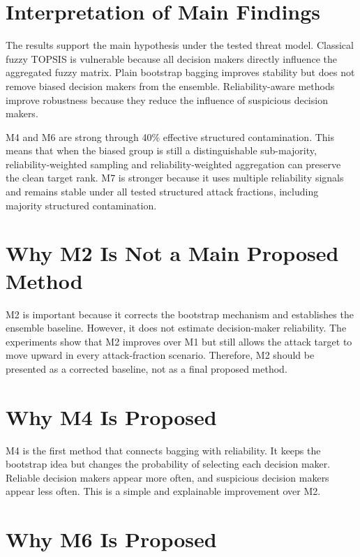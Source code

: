 \section{Interpretation of Main Findings}

The results support the main hypothesis under the tested threat model. Classical fuzzy TOPSIS is vulnerable because all decision makers directly influence the aggregated fuzzy matrix. Plain bootstrap bagging improves stability but does not remove biased decision makers from the ensemble. Reliability-aware methods improve robustness because they reduce the influence of suspicious decision makers.

M4 and M6 are strong through 40\% effective structured contamination. This means that when the biased group is still a distinguishable sub-majority, reliability-weighted sampling and reliability-weighted aggregation can preserve the clean target rank. M7 is stronger because it uses multiple reliability signals and remains stable under all tested structured attack fractions, including majority structured contamination.

\section{Why M2 Is Not a Main Proposed Method}

M2 is important because it corrects the bootstrap mechanism and establishes the ensemble baseline. However, it does not estimate decision-maker reliability. The experiments show that M2 improves over M1 but still allows the attack target to move upward in every attack-fraction scenario. Therefore, M2 should be presented as a corrected baseline, not as a final proposed method.

\section{Why M4 Is Proposed}

M4 is the first method that connects bagging with reliability. It keeps the bootstrap idea but changes the probability of selecting each decision maker. Reliable decision makers appear more often, and suspicious decision makers appear less often. This is a simple and explainable improvement over M2.

\section{Why M6 Is Proposed}

